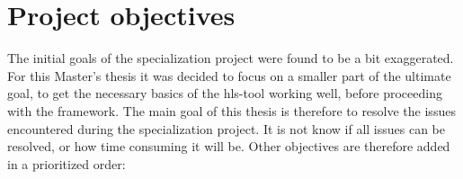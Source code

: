 \section{\label{sec:projectobj}Project objectives}
The initial goals of the specialization project were found to be a bit exaggerated. For this Master's thesis it was decided to focus on a smaller part of the ultimate goal, to get the necessary basics of the \gls{hls}-tool working well, before proceeding with the framework. The main goal of this thesis is therefore to resolve the issues encountered during the specialization project. It is not know if all issues can be resolved, or how time consuming it will be. Other objectives are therefore added in a prioritized order:

\newcommand\litem[1]{\item{\bfseries #1\\}}
